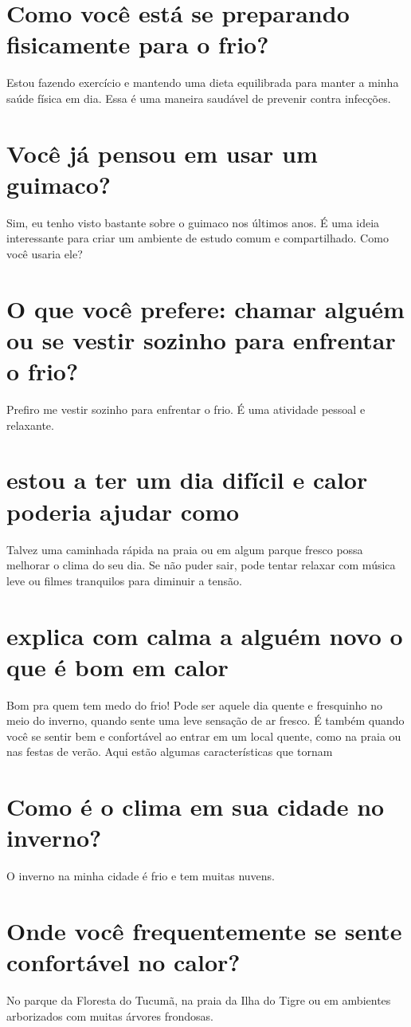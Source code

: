 \documentclass[11pt,a4paper]{article}
\begin{document}
\section{Como você está se preparando fisicamente para o frio?}
Estou fazendo exercício e mantendo uma dieta equilibrada para manter a minha saúde física em dia. Essa é uma maneira saudável de prevenir contra infecções.

\section{Você já pensou em usar um guimaco?}
Sim, eu tenho visto bastante sobre o guimaco nos últimos anos. É uma ideia interessante para criar um ambiente de estudo comum e compartilhado. Como você usaria ele?

\section{O que você prefere: chamar alguém ou se vestir sozinho para enfrentar o frio?}
Prefiro me vestir sozinho para enfrentar o frio. É uma atividade pessoal e relaxante.

\section{estou a ter um dia difícil e calor poderia ajudar como}
Talvez uma caminhada rápida na praia ou em algum parque fresco possa melhorar o clima do seu dia. Se não puder sair, pode tentar relaxar com música leve ou filmes tranquilos para diminuir a tensão.

\section{explica com calma a alguém novo o que é bom em calor}
Bom pra quem tem medo do frio! Pode ser aquele dia quente e fresquinho no meio do inverno, quando sente uma leve sensação de ar fresco. É também quando você se sentir bem e confortável ao entrar em um local quente, como na praia ou nas festas de verão. Aqui estão algumas características que tornam

\section{Como é o clima em sua cidade no inverno?}
O inverno na minha cidade é frio e tem muitas nuvens.

\section{Onde você frequentemente se sente confortável no calor?}
No parque da Floresta do Tucumã, na praia da Ilha do Tigre ou em ambientes arborizados com muitas árvores frondosas.
\end{document}
